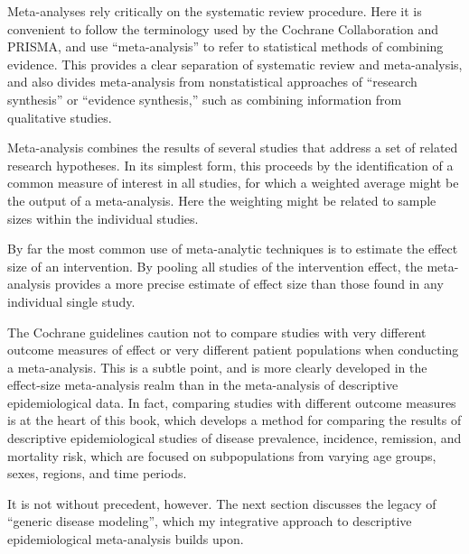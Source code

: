 Meta-analyses rely critically on the systematic review procedure. Here
it is convenient to follow the terminology used by the Cochrane
Collaboration and PRISMA, and use ``meta-analysis'' to refer to
statistical methods of combining evidence.  This provides a clear
separation of systematic review and meta-analysis, and also divides
meta-analysis from nonstatistical approaches of ``research
synthesis'' or ``evidence synthesis,'' such as combining information
from qualitative studies.

Meta-analysis combines the results of several studies that address a
set of related research hypotheses. In its simplest form, this
proceeds by the identification of a common measure of interest in all studies, for
which a weighted average might be the output of a meta-analysis. Here
the weighting might be related to sample sizes within the individual
studies.

By far the most common use of meta-analytic techniques is to estimate
the effect size of an intervention.  By pooling all studies of the
intervention effect, the meta-analysis provides a more precise
estimate of effect size than those found in any individual single
study.

The Cochrane guidelines caution not to compare studies with very
different outcome measures of effect or very different patient
populations when conducting a
meta-analysis.\cite{Cochrane_Cochrane_2012} This is a subtle point,
and is more clearly developed in the effect-size meta-analysis realm
than in the meta-analysis of descriptive epidemiological data.  In
fact, comparing studies with different outcome measures is at the
heart of this book, which develops a method for comparing the results
of descriptive epidemiological studies of disease prevalence,
incidence, remission, and mortality risk, which are focused on
subpopulations from varying age groups, sexes, regions, and time
periods.

It is not without precedent, however.  The next section discusses the
legacy of ``generic disease modeling'', which my integrative approach
to descriptive epidemiological meta-analysis builds upon.




